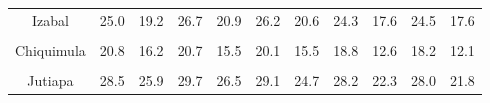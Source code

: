 {\begin{tabular}[t]{ccccccccccc}
Izabal & 25.0 & 19.2 & 26.7 & 20.9 & 26.2 & 20.6 & 24.3 & 17.6 & 24.5 & 17.6\\
\cellcolor[HTML]{B6B3FF}{Zacapa} & \cellcolor[HTML]{B6B3FF}{27.9} & \cellcolor[HTML]{B6B3FF}{21.8} & \cellcolor[HTML]{B6B3FF}{28.8} & \cellcolor[HTML]{B6B3FF}{22.5} & \cellcolor[HTML]{B6B3FF}{28.5} & \cellcolor[HTML]{B6B3FF}{23.2} & \cellcolor[HTML]{B6B3FF}{27.7} & \cellcolor[HTML]{B6B3FF}{23.0} & \cellcolor[HTML]{B6B3FF}{28.6} & \cellcolor[HTML]{B6B3FF}{23.6}\\
Chiquimula & 20.8 & 16.2 & 20.7 & 15.5 & 20.1 & 15.5 & 18.8 & 12.6 & 18.2 & 12.1\\
\cellcolor[HTML]{B6B3FF}{Jalapa} & \cellcolor[HTML]{B6B3FF}{19.9} & \cellcolor[HTML]{B6B3FF}{16.9} & \cellcolor[HTML]{B6B3FF}{20.5} & \cellcolor[HTML]{B6B3FF}{17.6} & \cellcolor[HTML]{B6B3FF}{20.8} & \cellcolor[HTML]{B6B3FF}{17.3} & \cellcolor[HTML]{B6B3FF}{18.8} & \cellcolor[HTML]{B6B3FF}{13.1} & \cellcolor[HTML]{B6B3FF}{18.4} & \cellcolor[HTML]{B6B3FF}{13.1}\\
Jutiapa & 28.5 & 25.9 & 29.7 & 26.5 & 29.1 & 24.7 & 28.2 & 22.3 & 28.0 & 21.8\\
\bottomrule
\end{tabular}
}